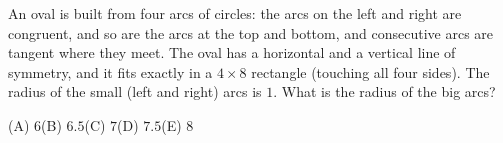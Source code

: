 An oval is built from four arcs of circles: the arcs on the left and right are congruent, and so are the arcs at the top and bottom, and consecutive arcs are tangent where they meet. The oval has a horizontal and a vertical line of symmetry, and it fits exactly in a $4\times8$ rectangle (touching all four sides). The radius of the small (left and right) arcs is $1$. What is the radius of the big arcs?

(A) $6$\quad (B) $6.5$\quad (C) $7$\quad (D) $7.5$\quad (E) $8$
